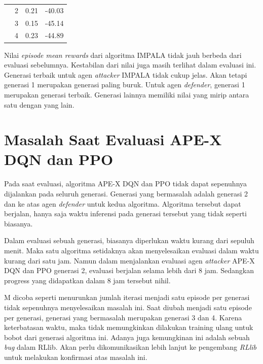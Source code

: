 \begin{table}[H]
\begin{tabular}{|c|c|l|l|}
    & 2                                                                            & 0.21                                                                                                  & -40.03                                                                                                \\ \cline{2-4} 
    & 3                                                                            & 0.15                                                                                                  & -45.14                                                                                                \\ \cline{2-4} 
    & 4                                                                            & 0.23                                                                                                  & -44.89                                                                                                \\ \hline
  \end{tabular}
\end{table}

Nilai \emph{episode mean rewards} dari algoritma IMPALA tidak jauh berbeda dari evaluasi sebelumnya.
Kestabilan dari nilai juga masih terlihat dalam evaluasi ini.
Generasi terbaik untuk agen \emph{attacker} IMPALA tidak cukup jelas.
Akan tetapi generasi 1 merupakan generasi paling buruk.
Untuk agen \emph{defender}, generasi 1 merupakan generasi terbaik.
Generasi lainnya memiliki nilai yang mirip antara satu dengan yang lain.

\section{Masalah Saat Evaluasi APE-X DQN dan PPO}
Pada saat evaluasi, algoritma APE-X DQN dan PPO tidak dapat sepenuhnya dijalankan pada seluruh generasi.
Generasi yang bermasalah adalah generasi 2 dan ke atas agen \emph{defender} untuk kedua algoritma.
Algoritma tersebut dapat berjalan, hanya saja waktu inferensi pada generasi tersebut yang tidak seperti biasanya.

Dalam evaluasi sebuah generasi, biasanya diperlukan waktu kurang dari sepuluh menit.
Maka satu algoritma setidaknya akan menyelesaikan evaluasi dalam waktu kurang dari satu jam.
Namun dalam menjalankan evaluasi agen \emph{attacker} APE-X DQN dan PPO generasi 2, evaluasi berjalan selama lebih dari 8 jam.
Sedangkan progress yang didapatkan dalam 8 jam tersebut nihil.

M dicoba seperti menurunkan jumlah iterasi menjadi satu episode per generasi tidak sepenuhnya menyelesaikan masalah ini.
Saat diubah menjadi satu episode per generasi, generasi yang bermasalah merupakan generasi 3 dan 4.
Karena keterbatasan waktu, maka tidak memungkinkan dilakukan training ulang untuk bobot dari generasi algoritma ini.
Adanya juga kemungkinan ini adalah sebuah \emph{bug} dalam RLlib.
Akan perlu dikomunikasikan lebih lanjut ke pengembang \emph{RLlib} untuk melakukan konfirmasi atas masalah ini.
